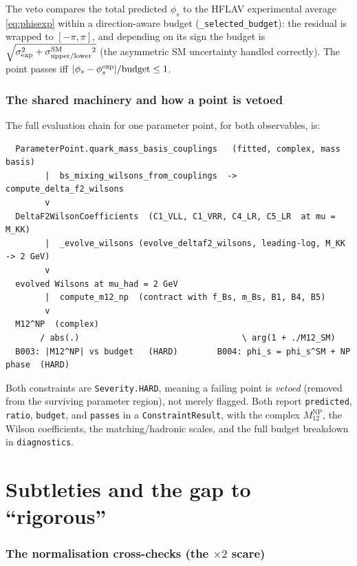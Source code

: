 \documentclass[11pt]{article}
\newcommand{\code}[1]{\texttt{#1}}
\newcommand{\phis}{\phi_s}
\newcommand{\MtwelveNP}{M_{12}^{\mathrm{NP}}}
\theoremstyle{definition}
\begin{document}
The veto compares the total predicted $\phis$ to the HFLAV experimental average
\eqref{eq:phisexp} within a direction-aware budget (\code{\_selected\_budget}):
the residual is wrapped to $[-\pi,\pi]$, and depending on its sign the budget is
$\sqrt{\sigma_{\rm exp}^2+\sigma^{\rm SM}_{\rm upper/lower}{}^2}$ (the asymmetric
SM uncertainty handled correctly). The point passes iff
$|\phis - \phis^{\rm exp}|/\text{budget} \le 1$.

\section{The shared machinery and how a point is vetoed}
\label{sec:codeflow}

The full evaluation chain for one parameter point, for both observables, is:
\begin{footnotesize}
\begin{verbatim}
  ParameterPoint.quark_mass_basis_couplings   (fitted, complex, mass basis)
        |  bs_mixing_wilsons_from_couplings  ->  compute_delta_f2_wilsons
        v
  DeltaF2WilsonCoefficients  (C1_VLL, C1_VRR, C4_LR, C5_LR  at mu = M_KK)
        |  _evolve_wilsons (evolve_deltaf2_wilsons, leading-log, M_KK -> 2 GeV)
        v
  evolved Wilsons at mu_had = 2 GeV
        |  compute_m12_np  (contract with f_Bs, m_Bs, B1, B4, B5)
        v
  M12^NP  (complex)
       / abs(.)                                 \ arg(1 + ./M12_SM)
  B003: |M12^NP| vs budget   (HARD)        B004: phi_s = phi_s^SM + NP phase  (HARD)
\end{verbatim}
\end{footnotesize}
Both constraints are \code{Severity.HARD}, meaning a failing point is
\emph{vetoed} (removed from the surviving parameter region), not merely flagged.
Both report \code{predicted}, \code{ratio}, \code{budget}, and \code{passes} in a
\code{ConstraintResult}, with the complex $\MtwelveNP$, the Wilson coefficients,
the matching/hadronic scales, and the full budget breakdown in
\code{diagnostics}.

\part{Subtleties and the gap to ``rigorous''}
\label{part:subtle}

\section{The normalisation cross-checks (the $\times 2$ scare)}
\label{sec:R5}
\end{document}
